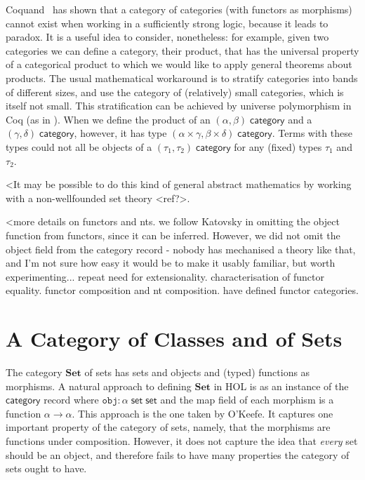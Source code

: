 \documentclass[twoside,titlepage,11pt]{article}
\begin{document}
Coquand~\cite{DBLP:conf/lics/Coquand86} has shown that a category of categories (with functors as morphisms) cannot exist when working in a sufficiently strong logic, because it leads to paradox.
It is a useful idea to consider, nonetheless: for example, given two categories we can define a category, their product, that has the universal property of a categorical product to which we would like to apply general theorems about products.
The usual mathematical workaround is to stratify categories into bands of different sizes, and use the category of (relatively) small categories, which is itself not small.
This stratification can be achieved by universe polymorphism in Coq (as in \cite{DBLP:conf/birthday/HuetS00}).
When we define the product of an $(\alpha,\beta)\;\mathsf{category}$ and a $(\gamma,\delta)\;\mathsf{category}$, however, it has type $(\alpha\times\gamma,\beta\times\delta)\;\mathsf{category}$.
Terms with these types could not all be objects of a $(\tau_1,\tau_2)\;\mathsf{category}$ for any (fixed) types $\tau_1$ and $\tau_2$.

<It may be possible to do this kind of general abstract mathematics by working with a non-wellfounded set theory <ref?>.

<more details on functors and nts. we follow Katovsky in omitting the object function from functors, since it can be inferred. However, we did not omit the object field from the category record - nobody has mechanised a theory like that, and I'm not sure how easy it would be to make it usably familiar, but worth experimenting...
repeat need for extensionality. characterisation of functor equality. functor composition and nt composition. have defined functor categories.
\section{A Category of Classes and of Sets}%
\newcommand{\Set}{\ensuremath{\mathbf{Set}}}
The category $\Set$ of sets has sets and objects and (typed) functions as morphisms.
A natural approach to defining $\Set$ in HOL is as an instance of the $\mathsf{category}$ record where $\mathtt{obj}:\alpha\;\mathsf{set}\;\mathsf{set}$ and the map field of each morphism is a function $\alpha\to\alpha$.
This approach is the one taken by O'Keefe.
It captures one important property of the category of sets, namely, that the morphisms are functions under composition.
However, it does not capture the idea that \emph{every} set should be an object, and therefore fails to have many properties the category of sets ought to have.
\end{document}
